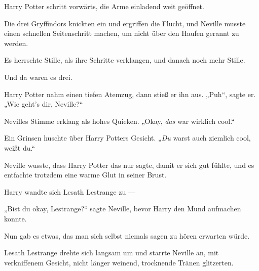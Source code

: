 Harry Potter schritt vorwärts, die Arme einladend weit geöffnet.

Die drei Gryffindors knickten ein und ergriffen die Flucht, und Neville musste einen schnellen Seitenschritt machen, um nicht über den Haufen gerannt zu werden.

Es herrschte Stille, als ihre Schritte verklangen, und danach noch mehr Stille.

Und da waren es drei.

Harry Potter nahm einen tiefen Atemzug, dann stieß er ihn aus.
„Puh“, sagte er.
„Wie geht’s dir, Neville?“

Nevilles Stimme erklang als hohes Quieken.
„Okay, \emph{das} war wirklich cool.“

Ein Grinsen huschte über Harry Potters Gesicht.
„\emph{Du} warst auch ziemlich cool, weißt du.“

Neville wusste, dass Harry Potter das nur sagte, damit er sich gut fühlte, und es entfachte trotzdem eine warme Glut in seiner Brust.

Harry wandte sich Lesath Lestrange zu —

„Bist du okay, Lestrange?“ sagte Neville, bevor Harry den Mund aufmachen konnte.

Nun gab es etwas, das man sich selbst niemals sagen zu hören erwarten würde.

Lesath Lestrange drehte sich langsam um und starrte Neville an, mit verkniffenem Gesicht, nicht länger weinend, trocknende Tränen glitzerten.


